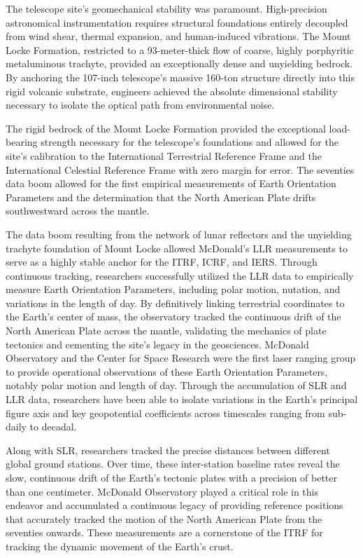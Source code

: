 The telescope site’s geomechanical stability was paramount. High-precision astronomical instrumentation requires structural foundations entirely decoupled from wind shear, thermal expansion, and human-induced vibrations. The Mount Locke Formation, restricted to a 93-meter-thick flow of coarse, highly porphyritic metaluminous trachyte, provided an exceptionally dense and unyielding bedrock. By anchoring the 107-inch telescope’s massive 160-ton structure directly into this rigid volcanic substrate, engineers achieved the absolute dimensional stability necessary to isolate the optical path from environmental noise.

The rigid bedrock of the Mount Locke Formation provided the exceptional load-bearing strength necessary for the telescope's foundations and allowed for the site’s calibration to the International Terrestrial Reference Frame and the International Celestial Reference Frame with zero margin for error. The seventies data boom allowed for the first empirical measurements of Earth Orientation Parameters and the determination that the North American Plate drifts southwestward across the mantle.

The data boom resulting from the network of lunar reflectors and the unyielding trachyte foundation of Mount Locke allowed McDonald’s LLR measurements to serve as a highly stable anchor for the ITRF, ICRF, and IERS. Through continuous tracking, researchers successfully utilized the LLR data to empirically measure Earth Orientation Parameters, including polar motion, nutation, and variations in the length of day. By definitively linking terrestrial coordinates to the Earth's center of mass, the observatory tracked the continuous drift of the North American Plate across the mantle, validating the mechanics of plate tectonics and cementing the site's legacy in the geosciences. McDonald Observatory and the Center for Space Research were the first laser ranging group to provide operational observations of these Earth Orientation Parameters, notably polar motion and length of day. Through the accumulation of SLR and LLR data, researchers have been able to isolate variations in the Earth's principal figure axis and key geopotential coefficients across timescales ranging from sub-daily to decadal.

Along with SLR, researchers tracked the precise distances between different global ground stations. Over time, these inter-station baseline rates reveal the slow, continuous drift of the Earth's tectonic plates with a precision of better than one centimeter. McDonald Observatory played a critical role in this endeavor and accumulated a continuous legacy of providing reference positions that accurately tracked the motion of the North American Plate from the seventies onwards. These measurements are a cornerstone of the ITRF for tracking the dynamic movement of the Earth's crust.

